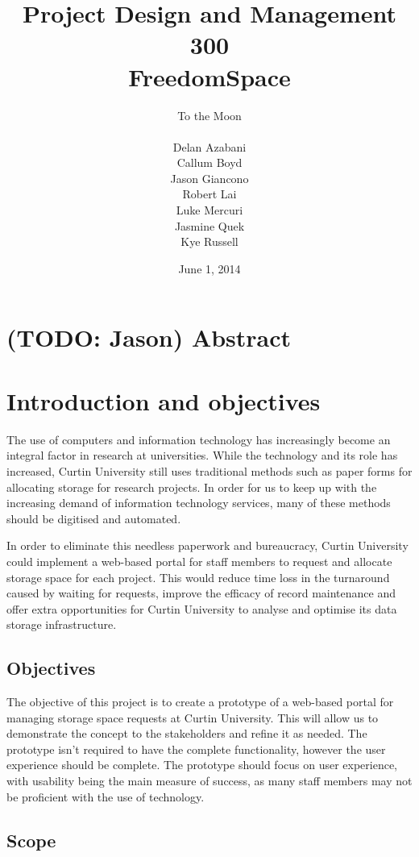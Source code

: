\documentclass[a4paper,titlepage,12pt]{article}
\title{Project Design and Management 300\\FreedomSpace}
\date{June 1, 2014}
\author{
	To the Moon \\
	\hspace{10 mm} \\
	Delan Azabani \\
	Callum Boyd \\
	Jason Giancono \\
	Robert Lai \\
	Luke Mercuri \\
	Jasmine Quek \\
	Kye Russell \\
}
\let\stdsection\section
\renewcommand\section{\newpage\stdsection}
\begin{document}
\maketitle
{}
\tableofcontents
\listoffigures
{}

\section{(TODO: Jason) Abstract}

\section{Introduction and objectives}

The use of computers and information technology has increasingly become an
integral factor in research at universities. While the technology and its role
has increased, Curtin University still uses traditional methods such as paper
forms for allocating storage for research projects. In order for us to keep up
with the increasing demand of information technology services, many of these
methods should be digitised and automated.

In order to eliminate this needless paperwork and bureaucracy, Curtin
University could implement a web-based portal for staff members to request and
allocate storage space for each project. This would reduce time loss in the
turnaround caused by waiting for requests, improve the efficacy of record
maintenance and offer extra opportunities for Curtin University to analyse and
optimise its data storage infrastructure.

\subsection{Objectives}

The objective of this project is to create a prototype of a web-based portal
for managing storage space requests at Curtin University. This will allow us to
demonstrate the concept to the stakeholders and refine it as needed. The
prototype isn't required to have the complete functionality, however the user
experience should be complete. The prototype should focus on user experience,
with usability being the main measure of success, as many staff members may not
be proficient with the use of technology.

\subsection{Scope}
\end{document}
